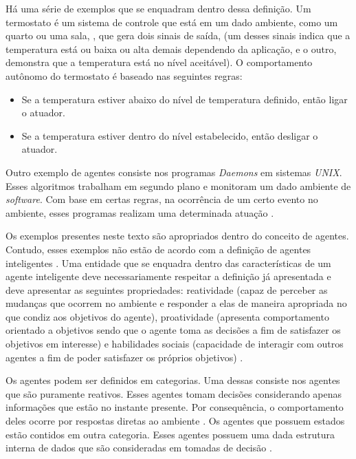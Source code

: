 Há uma série de exemplos que se enquadram dentro dessa definição. Um termostato é um sistema de controle que está em um dado ambiente, como um quarto ou uma sala, \cite{whatisagent}, que gera dois sinais de saída, (um desses sinais indica que a temperatura está ou baixa ou alta demais dependendo da aplicação, e o outro, demonstra que a temperatura está no nível aceitável). O comportamento autônomo do termostato é baseado nas seguintes regras:

\begin{itemize}
    \item Se a temperatura estiver abaixo do nível de temperatura definido, então ligar o atuador.
    \item Se a temperatura estiver dentro do nível estabelecido, então desligar o atuador.
\end{itemize}

Outro exemplo de agentes consiste nos programas \textit{Daemons} em sistemas \textit{UNIX}. Esses algoritmos trabalham em segundo plano e monitoram um dado ambiente de \textit{software}. Com base em certas regras, na ocorrência de um certo evento no ambiente, esses programas realizam uma determinada atuação \cite{whatisagent}.   

Os exemplos presentes neste texto são apropriados dentro do conceito de agentes. Contudo, esses exemplos não estão de acordo com a definição de agentes inteligentes \cite{whatisagent}. Uma entidade que se enquadra dentro das características de um agente inteligente deve necessariamente respeitar a definição já apresentada e deve apresentar as seguintes propriedades: reatividade (capaz de perceber as mudanças
que ocorrem no ambiente e responder a elas de maneira apropriada no que condiz aos objetivos do agente), proatividade (apresenta comportamento orientado a objetivos sendo que o agente toma as decisões a fim de satisfazer os objetivos em interesse) e habilidades sociais (capacidade de interagir com outros agentes a fim de poder satisfazer os próprios objetivos) \cite{whatisagent,artificialinteligencemodermapproach}.

Os agentes podem ser definidos em categorias. Uma dessas consiste nos agentes que são puramente reativos. Esses agentes tomam decisões considerando apenas informações que estão no instante presente. Por consequência, o comportamento deles ocorre por respostas diretas ao ambiente \cite{whatisagent}. Os agentes que possuem estados estão contidos em outra categoria. Esses agentes possuem uma dada estrutura interna de dados que são consideradas em tomadas de decisão \cite{whatisagent}.

